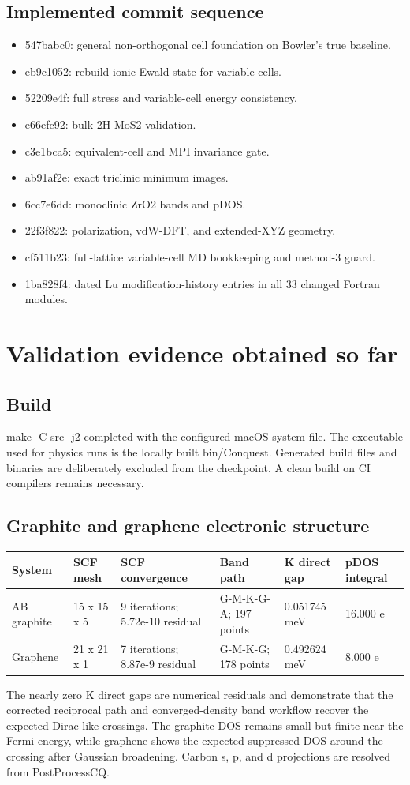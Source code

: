 \documentclass[10pt,a4paper]{report}
\begin{document}
\section{Implemented commit sequence}
\begin{itemize}
\item 547babc0: general non-orthogonal cell foundation on Bowler's true baseline.
\item eb9c1052: rebuild ionic Ewald state for variable cells.
\item 52209e4f: full stress and variable-cell energy consistency.
\item e66efc92: bulk 2H-MoS2 validation.
\item c3e1bca5: equivalent-cell and MPI invariance gate.
\item ab91af2e: exact triclinic minimum images.
\item 6cc7e6dd: monoclinic ZrO2 bands and pDOS.
\item 22f3f822: polarization, vdW-DFT, and extended-XYZ geometry.
\item cf511b23: full-lattice variable-cell MD bookkeeping and method-3 guard.
\item 1ba828f4: dated Lu modification-history entries in all 33 changed Fortran modules.
\end{itemize}
\chapter{Validation evidence obtained so far}
\section{Build}
make -C src -j2 completed with the configured macOS system file. The executable used for physics runs is the locally built bin/Conquest. Generated build files and binaries are deliberately excluded from the checkpoint. A clean build on CI compilers remains necessary.

\section{Graphite and graphene electronic structure}
\small\begin{longtable}{p{}|p{}|p{}|p{}|p{}|p{}}
\toprule System & SCF mesh & SCF convergence & Band path & K direct gap & pDOS integral\\ \midrule\endhead
AB graphite & 15 x 15 x 5 & 9 iterations; 5.72e-10 residual & G-M-K-G-A; 197 points & 0.051745 meV & 16.000 e\\
Graphene & 21 x 21 x 1 & 7 iterations; 8.87e-9 residual & G-M-K-G; 178 points & 0.492624 meV & 8.000 e\\
\bottomrule\end{longtable}\normalsize
The nearly zero K direct gaps are numerical residuals and demonstrate that the corrected reciprocal path and converged-density band workflow recover the expected Dirac-like crossings. The graphite DOS remains small but finite near the Fermi energy, while graphene shows the expected suppressed DOS around the crossing after Gaussian broadening. Carbon s, p, and d projections are resolved from PostProcessCQ.
\end{document}
